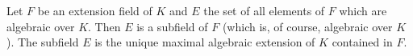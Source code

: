 Let $F$ be an extension field of $K$ and $E$ the set of all elements of $F$ which are algebraic over $K$. Then $E$ is a subfield of $F$ (which is, of course, algebraic over $K$). The subfield $E$ is the unique maximal algebraic extension of $K$ contained in $F$.
